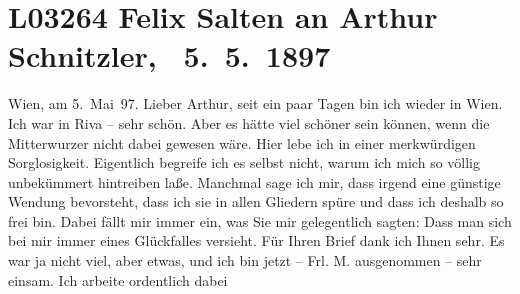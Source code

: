 

\section[ Felix Salten an Arthur Schnitzler, 5. 5. 1897]{L03264 Felix Salten an Arthur Schnitzler,  5. 5. 1897}
\nopagebreak{}
\rehead{ }\normalsize\beginnumbering{}
\toendnotes[C]{\smallbreak\pagebreak[2]}
\toendnotes[C]{\smallbreak}
\toendnotes[C]{\smallbreak}
\pstart
           \raggedleft{}{\pb}Wien, am 5. Mai 97.\pend
           \vspace{0.5em}
\pstart
           Lieber Arthur, seit ein paar Tagen bin ich wieder in Wien. Ich war in Riva – sehr schön. Aber es hätte viel schöner sein können, wenn die Mitterwurzer nicht dabei gewesen wäre. Hier lebe ich in einer
               merkwürdigen Sorglosigkeit. Eigentlich begreife ich es selbst nicht, warum ich mich
               so völlig unbekümmert hintreiben laße. Manchmal sage ich mir, dass irgend eine
               günstige Wendung bevorsteht, dass ich sie in allen Gliedern spüre und dass ich
               deshalb so frei bin. Dabei fällt mir immer ein, was Sie mir gelegentlich sagten: Dass
               man sich bei mir immer eines Glückfalles versieht. Für Ihren Brief dank ich Ihnen
               sehr. Es war ja nicht viel, aber etwas, und ich bin jetzt – Frl. M. ausgenommen – sehr einsam. Ich arbeite ordentlich dabei
